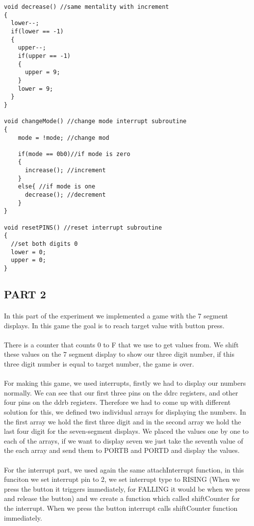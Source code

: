\documentclass[pdftex,12pt,a4paper]{article}
\begin{document}
\begin{flushleft}
\begin{lstlisting}[style={Arduino}]
void decrease() //same mentality with increment
{
  lower--;
  if(lower == -1)
  {
    upper--;
   	if(upper == -1)
    {
      upper = 9;
    }
    lower = 9;
  }
}

void changeMode() //change mode interrupt subroutine
{
    mode = !mode; //change mod
  
  	if(mode == 0b0)//if mode is zero
    {
      increase(); //increment
    }
    else{ //if mode is one
      decrease(); //decrement
    }
}

void resetPINS() //reset interrupt subroutine
{
  //set both digits 0
  lower = 0; 
  upper = 0;
}
\end{lstlisting}
\end{flushleft}

\begin{flushleft}
\subsection{PART 2}
\paragraph{}
In this part of the experiment we implemented a game with the 7 segment displays. In this game the goal is to reach target value with button press.
\paragraph{}
There is a counter that counts 0 to F that we use to get values from. We shift these values on the 7 segment display to show our three digit number, if this three digit number is equal to target number, the game is over.
\paragraph{}
For making this game, we used interrupts, firstly we had to display our numbers normally. We can see that our first three pins on the ddrc registers, and other four pins on the ddrb registers. Therefore we had to come up with different solution for this, we defined two individual arrays for displaying the numbers. In the first array we hold the first three digit and in the second array we hold the last four digit for the seven-segment displays. We placed the values one by one to each of the arrays, if we want to display seven we just take the seventh value of the each array and send them to PORTB and PORTD and display the values.
\paragraph{}
For the interrupt part, we used again the same attachInterrupt function, in this funciton we set interrupt pin to 2, we set interrupt type to RISING (When we press the button it triggers immediately, for FALLING it would be when we press and release the button) and we create a function which called shiftCounter for the interrupt. When we press the button interrupt calls shiftCounter function immediately.

\end{flushleft}
\end{document}
